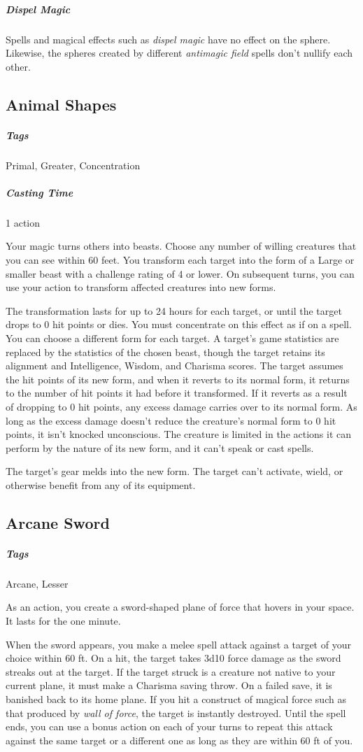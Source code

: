 \subparagraph*{Dispel Magic} Spells and magical effects such as \textit{dispel magic} have no effect on the sphere. Likewise, the spheres created by different \textit{antimagic field} spells don’t nullify each other.

\subsection{Animal Shapes}
\subparagraph*{Tags} Primal, Greater, Concentration
\subparagraph*{Casting Time} 1 action

Your magic turns others into beasts. Choose any number of willing creatures that you can see within 60 feet. You transform each target into the form of a Large or smaller beast with a challenge rating of 4 or lower. On subsequent turns, you can use your action to transform affected creatures into new forms.

The transformation lasts for up to 24 hours for each target, or until the target drops to 0 hit points or dies. You must concentrate on this effect as if on a spell. You can choose a different form for each target. A target’s game statistics are replaced by the statistics of the chosen beast, though the target retains its alignment and Intelligence, Wisdom, and Charisma scores. The target assumes the hit points of its new form, and when it reverts to its normal form, it returns to the number of hit points it had before it transformed. If it reverts as a result of dropping to 0 hit points, any excess damage carries over to its normal form. As long as the excess damage doesn’t reduce the creature’s normal form to 0 hit points, it isn’t knocked unconscious. The creature is limited in the actions it can perform by the nature of its new form, and it can’t speak or cast spells.

The target’s gear melds into the new form. The target can’t activate, wield, or otherwise benefit from any of its equipment.

\subsection{Arcane Sword}

\subparagraph*{Tags} Arcane, Lesser

As an action, you create a sword-shaped plane of force that hovers in your space. It lasts for the one minute.

When the sword appears, you make a melee spell attack against a target of your choice within 60 ft. On a hit, the target takes 3d10 force damage as the sword streaks out at the target. If the target struck is a creature not native to your current plane, it must make a Charisma saving throw. On a failed save, it is banished back to its home plane. If you hit a construct of magical force such as that produced by \textit{wall of force}, the target is instantly destroyed. Until the spell ends, you can use a bonus action on each of your turns to repeat this attack against the same target or a different one as long as they are within 60 ft of you.

